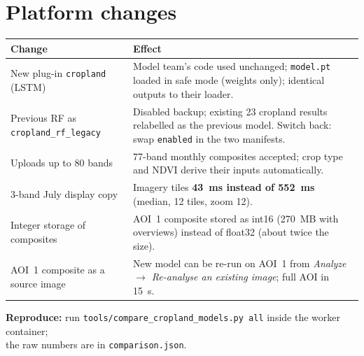 \documentclass[11pt,a4paper]{article}
\begin{document}
\section{Platform changes}
\begin{tabularx}{\textwidth}{L{4.6cm} Y}
\toprule
\textbf{Change} & \textbf{Effect}\\
\midrule
New plug-in \texttt{cropland} (LSTM) & Model team's code used unchanged; \texttt{model.pt} loaded in safe mode (weights only); identical outputs to their loader.\\
Previous RF as \texttt{cropland\_rf\_legacy} & Disabled backup; existing 23 cropland results relabelled as the previous model. Switch back: swap \texttt{enabled} in the two manifests.\\
Uploads up to 80 bands & 77-band monthly composites accepted; crop type and NDVI derive their inputs automatically.\\
3-band July display copy & Imagery tiles \textbf{43~ms instead of 552~ms} (median, 12 tiles, zoom 12).\\
Integer storage of composites & AOI~1 composite stored as int16 (270~MB with overviews) instead of float32 (about twice the size).\\
AOI~1 composite as a source image & New model can be re-run on AOI~1 from \emph{Analyze $\rightarrow$ Re-analyse an existing image}; full AOI in 15~s.\\
\bottomrule
\end{tabularx}

\textbf{Reproduce:} run \texttt{tools/compare\_cropland\_models.py all} inside the worker container;\\ the raw numbers are in \texttt{comparison.json}.
\end{document}
